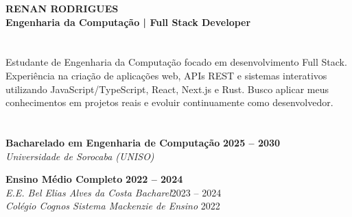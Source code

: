\documentclass[,a4paper]{article}
\begin{document}
\begin{minipage}[t]{11.5cm} %
  \vspace{1.2cm}
  {\Huge \textbf{\color{white} RENAN RODRIGUES}} \\
  \vspace{0.2cm}
  {\hspace*{1cm}\large\textbf{ \color{white!80} Engenharia da Computação | Full Stack Developer}}

  \vspace{1.4cm}

  \begin{minipage}{11.0cm}
    \section*{\hspace*{0.5cm}\vspace{-0.4cm}\color{mainpurple}{\faIdCard \quad RESUMO}}
    \vspace{0.2cm}
    {\normalsize \color{textgray} Estudante de Engenharia da Computação focado em desenvolvimento Full Stack. Experiência na criação de aplicações web, APIs REST e sistemas interativos utilizando JavaScript/TypeScript, React, Next.js e Rust. Busco aplicar meus conhecimentos em projetos reais e evoluir continuamente como desenvolvedor.\par}
    \vspace*{-0.2cm}
    \section*{\hspace*{0.5cm}\color{mainpurple}{\faGraduationCap \quad FORMAÇÃO}}
    \noindent \textbf{Bacharelado em Engenharia de Computação} \hfill \textbf{2025 -- 2030} \\
    \textit{\color{textgray}Universidade de Sorocaba (UNISO)}\par
    \vspace{0.3cm}
    \noindent \textbf{Ensino Médio Completo} \hfill \textbf{2022 -- 2024} \\
    \textit{\color{textgray}E.E. Bel Elias Alves da Costa Bacharel}{\color{textgray}\hfill{2023 -- 2024}}\\
    \textit{\color{textgray}Colégio Cognos Sistema Mackenzie de Ensino} {\color{textgray}\hfill{2022}}
    \vspace*{-0.2cm}

\end{minipage}
\end{minipage}
\end{document}
